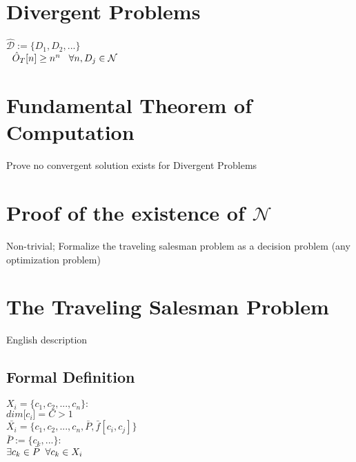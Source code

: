 \documentclass[11pt]{article}
\begin{document}
\section{Divergent Problems}
\begin{center}
$
\mathcal{\hat{D}} := \{ D_1,D_2,...\} 
$
\\ \vspace{2mm}
$
\hspace{2mm} \hat{O}_T[n] \geq n^n \hspace{3mm} \forall n, D_j \in \mathcal{N}
$
\end{center}









\section{Fundamental Theorem of Computation}
Prove no convergent solution exists for Divergent Problems









\section{Proof of the existence of $\mathcal{N}$}
Non-trivial; Formalize the traveling salesman problem as a decision problem (any optimization problem)



\newpage
\section{The Traveling Salesman Problem}
English description

\subsection{Formal Definition}
\begin{center}
$
X_i = \{ c_1,c_2,...,c_n \} :
$
\\ \vspace{2mm}
$
dim\lbrack c_i \rbrack = C > 1
$
\\ \vspace{4mm} 
$
\bar{X_i} = \{ c_1,c_2,...,c_n,\bar{P},\bar{f}[c_i,c_j] \}
$
\\ \vspace{2mm}
$
\bar{P} := \{c_k,...\} :
$
\\ \vspace{2mm}
$
\exists c_k \in \bar{P} \hspace{2mm} \forall c_k \in X_i
$
\end{center}
\end{document}
